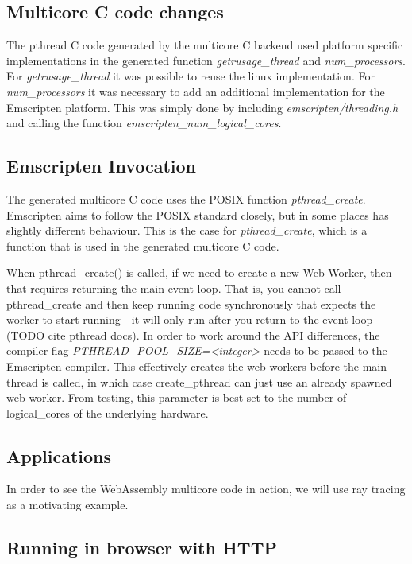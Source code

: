 \documentclass[11pt]{book}
\begin{document}
\subsection{Multicore C code changes}
The pthread C code generated by the multicore C backend used platform specific implementations in the generated function \textit{getrusage\_thread} and \textit{num\_processors}. For \textit{getrusage\_thread} it was possible to reuse the linux implementation. For \textit{num\_processors} it was necessary to add an additional implementation for the Emscripten platform. This was simply done by including \textit{emscripten/threading.h} and calling the function \textit{emscripten\_num\_logical\_cores}.




\subsection{Emscripten Invocation}

The generated multicore C code uses the POSIX function \textit{pthread\_create}. Emscripten aims to follow the POSIX standard closely, but in some places has slightly different behaviour. This is the case for \textit{pthread\_create}, which is a function that is used in the generated multicore C code. 

When pthread\_create() is called, if we need to create a new Web Worker, then that requires returning the main event loop. That is, you cannot call pthread\_create and then keep running code synchronously that expects the worker to start running - it will only run after you return to the event loop (TODO cite pthread docs). In order to work around the API differences, the compiler flag \textit{PTHREAD\_POOL\_SIZE=<integer>} needs to be passed to the Emscripten compiler. This effectively creates the web workers before the main thread is called, in which case create\_pthread can just use an already spawned web worker. From testing, this parameter is best set to the number of logical\_cores of the underlying hardware.




\subsection{Applications}

In order to see the WebAssembly multicore code in action, we will use ray tracing as a motivating example. 


\subsection{Running in browser with HTTP}
\end{document}
